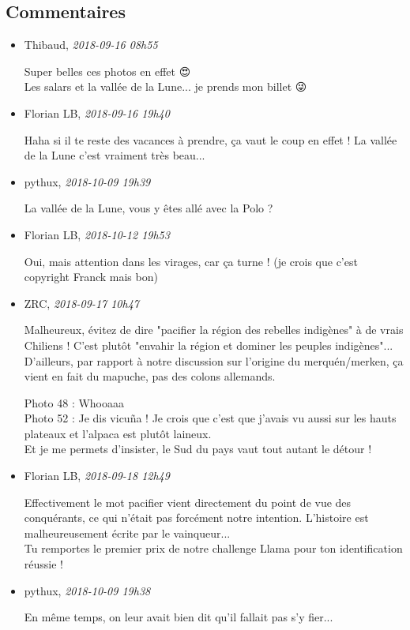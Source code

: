 \documentclass[]{article}
\date{}
\begin{document}
\hypertarget{commentaires}{%
\subsection{Commentaires}\label{commentaires}}

\begin{itemize}
\item
  Thibaud, \emph{2018-09-16 08h55}

  Super belles ces photos en effet 😍\\
  Les salars et la vallée de la Lune... je prends mon billet 😜
\item
  Florian LB, \emph{2018-09-16 19h40}

  Haha si il te reste des vacances à prendre, ça vaut le coup en effet !
  La vallée de la Lune c'est vraiment très beau...
\item
  pythux, \emph{2018-10-09 19h39}

  La vallée de la Lune, vous y êtes allé avec la Polo ?
\item
  Florian LB, \emph{2018-10-12 19h53}

  Oui, mais attention dans les virages, car ça turne ! (je crois que
  c'est copyright Franck mais bon)
\item
  ZRC, \emph{2018-09-17 10h47}

  Malheureux, évitez de dire "pacifier la région des rebelles indigènes"
  à de vrais Chiliens ! C'est plutôt "envahir la région et dominer les
  peuples indigènes"... D'ailleurs, par rapport à notre discussion sur
  l'origine du merquén/merken, ça vient en fait du mapuche, pas des
  colons allemands.

  Photo 48 : Whooaaa\\
  Photo 52 : Je dis vicuña ! Je crois que c'est que j'avais vu aussi sur
  les hauts plateaux et l'alpaca est plutôt laineux.\\
  Et je me permets d'insister, le Sud du pays vaut tout autant le détour
  !
\item
  Florian LB, \emph{2018-09-18 12h49}

  Effectivement le mot pacifier vient directement du point de vue des
  conquérants, ce qui n'était pas forcément notre intention. L'histoire
  est malheureusement écrite par le vainqueur...\\
  Tu remportes le premier prix de notre challenge Llama pour ton
  identification réussie !
\item
  pythux, \emph{2018-10-09 19h38}

  En même temps, on leur avait bien dit qu'il fallait pas s'y fier...
\end{itemize}
\end{document}
